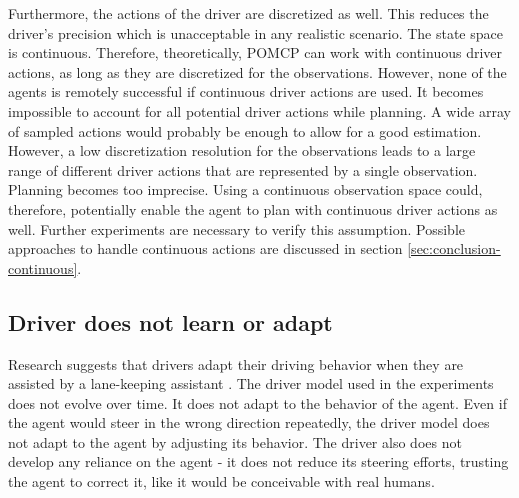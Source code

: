 Furthermore, the actions of the driver are discretized as well. This reduces the driver's precision which is unacceptable in any realistic scenario. The state space is continuous. Therefore, theoretically, POMCP can work with continuous driver actions, as long as they are discretized for the observations. However, none of the agents is remotely successful if continuous driver actions are used. It becomes impossible to account for all potential driver actions while planning. A wide array of sampled actions would probably be enough to allow for a good estimation. However, a low discretization resolution for the observations leads to a large range of different driver actions that are represented by a single observation. Planning becomes too imprecise. Using a continuous observation space could, therefore, potentially enable the agent to plan with continuous driver actions as well. Further experiments are necessary to verify this assumption. Possible approaches to handle continuous actions are discussed in section \ref{sec:conclusion-continuous}.

\subsection{Driver does not learn or adapt}

Research suggests that drivers adapt their driving behavior when they are assisted by a lane-keeping assistant \parencite{behavior_adapt}. The driver model used in the experiments does not evolve over time. It does not adapt to the behavior of the agent. Even if the agent would steer in the wrong direction repeatedly, the driver model does not adapt to the agent by adjusting its behavior. The driver also does not develop any reliance on the agent - it does not reduce its steering efforts, trusting the agent to correct it, like it would be conceivable with real humans.